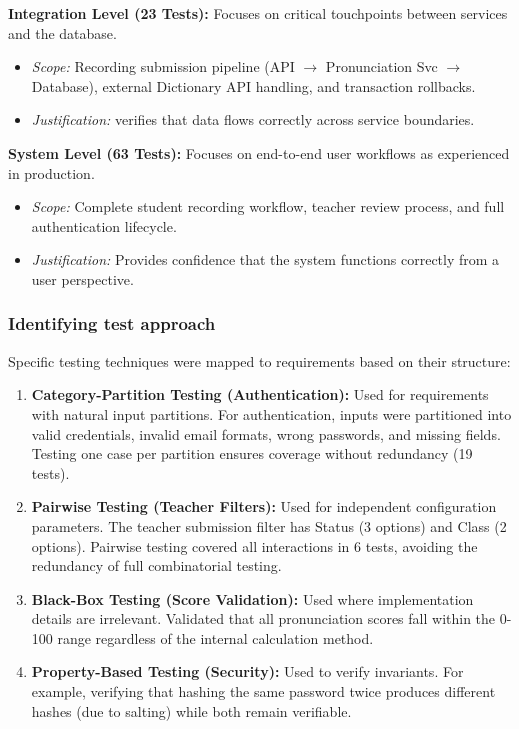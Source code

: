 \documentclass[sigconf]{acmart}
\begin{document}
\textbf{Integration Level (23 Tests):}
Focuses on critical touchpoints between services and the database.
\begin{itemize}
    \item \textit{Scope:} Recording submission pipeline (API $\to$ Pronunciation Svc $\to$ Database), external Dictionary API handling, and transaction rollbacks.
    \item \textit{Justification:} verifies that data flows correctly across service boundaries.
\end{itemize}

\textbf{System Level (63 Tests):}
Focuses on end-to-end user workflows as experienced in production.
\begin{itemize}
    \item \textit{Scope:} Complete student recording workflow, teacher review process, and full authentication lifecycle.
    \item \textit{Justification:} Provides confidence that the system functions correctly from a user perspective.
\end{itemize}

\subsubsection{Identifying test approach}

Specific testing techniques were mapped to requirements based on their structure:

\begin{enumerate}
    \item \textbf{Category-Partition Testing (Authentication):}
    Used for requirements with natural input partitions. For authentication, inputs were partitioned into valid credentials, invalid email formats, wrong passwords, and missing fields. Testing one case per partition ensures coverage without redundancy (19 tests).

    \item \textbf{Pairwise Testing (Teacher Filters):}
    Used for independent configuration parameters. The teacher submission filter has Status (3 options) and Class (2 options). Pairwise testing covered all interactions in 6 tests, avoiding the redundancy of full combinatorial testing.

    \item \textbf{Black-Box Testing (Score Validation):}
    Used where implementation details are irrelevant. Validated that all pronunciation scores fall within the 0-100 range regardless of the internal calculation method.

    \item \textbf{Property-Based Testing (Security):}
    Used to verify invariants. For example, verifying that hashing the same password twice produces different hashes (due to salting) while both remain verifiable.
\end{enumerate}
\end{document}
